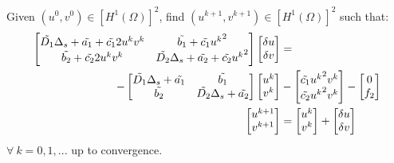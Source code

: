 Given $\left(u^0, v^0\right) \in \left[H^1\left(\Omega\right)\right]^2 $, find $\left(u^{k+1}, v^{k+1}\right) \in \left[H^1\left(\Omega\right)\right]^2 $ such that:
\begin{equation}\label{eq:NewtonSF}
\begin{aligned}
\begin{bmatrix}
    \Tilde{D_1} \Delta_s + \Tilde{a_1} + \Tilde{c_1} 2 u^k v^k & \Tilde{b_1} + \Tilde{c_1} {u^k}^2 \\ \Tilde{b_2} + \Tilde{c_2} 2 u^k v^k & \Tilde{D_2} \Delta_s + \Tilde{a_2} + \Tilde{c_2} {u^k}^2 \end{bmatrix} \begin{bmatrix} \delta u \\ \delta v \end{bmatrix} & = \\
    - \begin{bmatrix}
    \Tilde{D_1} \Delta_s + \Tilde{a_1} & \Tilde{b_1} \\ \Tilde{b_2} & \Tilde{D_2} \Delta_s + \Tilde{a_2} \end{bmatrix} \begin{bmatrix} u^k \\ v^k \end{bmatrix} & - \begin{bmatrix} \Tilde{c_1} {u^k}^2 v^k \\ \Tilde{c_2} {u^k}^2 v^k  \end{bmatrix} - \begin{bmatrix}0 \\ f_2\end{bmatrix} \\
 \begin{bmatrix}u^{k+1} \\ v^{k+1} \end{bmatrix} & =  \begin{bmatrix}u^{k} \\ v^{k} \end{bmatrix} +  \begin{bmatrix} \delta u \\ \delta v \end{bmatrix}
\end{aligned}
\end{equation}
$\forall \ k = 0,1,...$ up to convergence.


